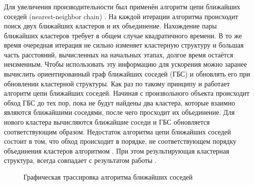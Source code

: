\documentclass[12pt]{diploma}
\begin{document}
		

	  
	\subsubsection{\AWard}
	Для увеличения производительности \AWard был применён алгоритм цепи ближайших соседей (nearest-neighbor chain) \cite{nnc}. На каждой итерации алгоритма \Ward происходит поиск двух ближайших кластеров и их объединение. Нахождение пары ближайших кластеров требует в общем случае квадратичного времени. В то же время очередная итерация не сильно изменяет кластерную структуру и большая часть расстояний, вычисленных на начальных этапах, долгое время остаётся неизменным. Чтобы использовать эту информацию для ускорения \Ward можно заранее вычислить ориентированный граф ближайших соседей (ГБС) и обновлять его  при обновлении кластерной структуры. Как раз по такому принципу и работает алгоритм цепи ближайших соседей. Начиная с произвольного объекта происходит обход ГБС до тех пор, пока не будут найдены два кластера, которые взаимно являются ближайшими соседями, после чего просходит их объединение. Для нового кластера вычисляются ближайшие соседи и ГБС обновляется соответствующим образом. Недостаток алгоритма цепи ближайших соседей состоит в том, что обход происходит в порядке, не соответствующем порядку объединения кластеров алгоритмом \Ward. При этом результирующая кластерная структура, всегда совпадает с результатом работы \Ward. 

	\begin{figure} %
		\centering
		\caption{Графическая трассировка алгоритма ближайших соседей}
		\label{fig:nnc}
	\end{figure}	
\end{document}
